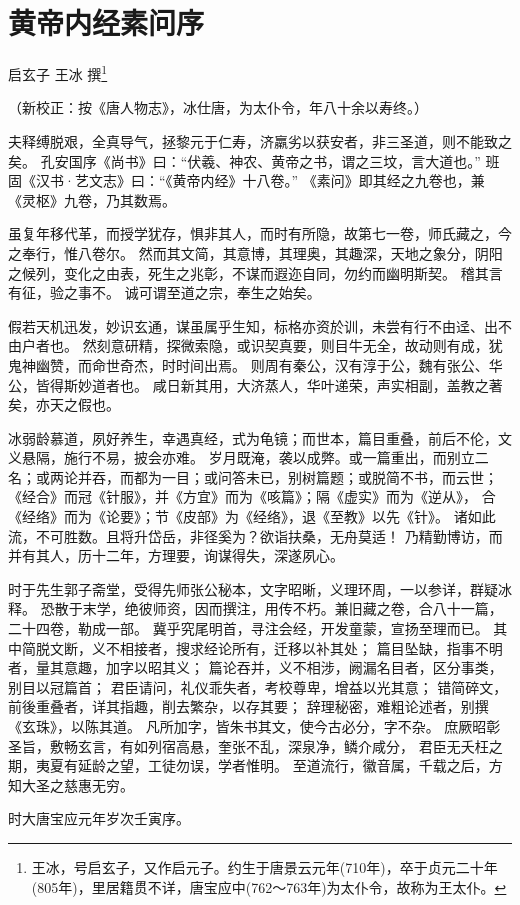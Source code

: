 \chapter{黄帝内经素问序}

\centerline{启玄子 \quad 王冰 \quad  撰\footnote{王冰，号启玄子，又作启元子。约生于唐景云元年(710年)，卒于贞元二十年(805年)，里居籍贯不详，唐宝应中(762～763年)为太仆令，故称为王太仆。}}

（新校正：按《唐人物志》，冰仕唐，为太仆令，年八十余以寿终。）

夫释缚脱艰，全真导气，拯黎元于仁寿，济羸劣以获安者，非三圣道，则不能致之矣。
孔安国序《尚书》曰：“伏羲、神农、黄帝之书，谓之三坟，言大道也。”
班固《汉书·艺文志》曰：“《黄帝内经》十八卷。”
《素问》即其经之九卷也，兼《灵枢》九卷，乃其数焉。

虽复年移代革，而授学犹存，惧非其人，而时有所隐，故第七一卷，师氏藏之，今之奉行，惟八卷尔。
然而其文简，其意博，其理奥，其趣深，天地之象分，阴阳之候列，变化之由表，死生之兆彰，不谋而遐迩自同，勿约而幽明斯契。
稽其言有征，验之事不。
诚可谓至道之宗，奉生之始矣。

假若天机迅发，妙识玄通，谋虽属乎生知，标格亦资於训，未尝有行不由迳、出不由户者也。
然刻意研精，探微索隐，或识契真要，则目牛无全，故动则有成，犹鬼神幽赞，而命世奇杰，时时间出焉。
则周有秦公，汉有淳于公，魏有张公、华公，皆得斯妙道者也。
咸日新其用，大济蒸人，华叶递荣，声实相副，盖教之著矣，亦天之假也。

冰弱龄慕道，夙好养生，幸遇真经，式为龟镜；而世本，篇目重叠，前后不伦，文义悬隔，施行不易，披会亦难。
岁月既淹，袭以成弊。或一篇重出，而别立二名；或两论并吞，而都为一目；或问答未已，别树篇题；或脱简不书，而云世；
《经合》而冠《针服》，并《方宜》而为《咳篇》；隔《虚实》而为《逆从》，
合《经络》而为《论要》；节《皮部》为《经络》，退《至教》以先《针》。
诸如此流，不可胜数。且将升岱岳，非径奚为？欲诣扶桑，无舟莫适！
乃精勤博访，而并有其人，历十二年，方理要，询谋得失，深遂夙心。

时于先生郭子斋堂，受得先师张公秘本，文字昭晰，义理环周，一以参详，群疑冰释。
恐散于末学，绝彼师资，因而撰注，用传不朽。兼旧藏之卷，合八十一篇，二十四卷，勒成一部。
冀乎究尾明首，寻注会经，开发童蒙，宣扬至理而已。
其中简脱文断，义不相接者，搜求经论所有，迁移以补其处；
篇目坠缺，指事不明者，量其意趣，加字以昭其义；
篇论吞并，义不相涉，阙漏名目者，区分事类，别目以冠篇首；
君臣请问，礼仪乖失者，考校尊卑，增益以光其意；
错简碎文，前後重叠者，详其指趣，削去繁杂，以存其要；
辞理秘密，难粗论述者，别撰《玄珠》，以陈其道。
凡所加字，皆朱书其文，使今古必分，字不杂。
庶厥昭彰圣旨，敷畅玄言，有如列宿高悬，奎张不乱，深泉净，鳞介咸分，
君臣无夭枉之期，夷夏有延龄之望，工徒勿误，学者惟明。
至道流行，徽音属，千载之后，方知大圣之慈惠无穷。

时大唐宝应元年岁次壬寅序。
